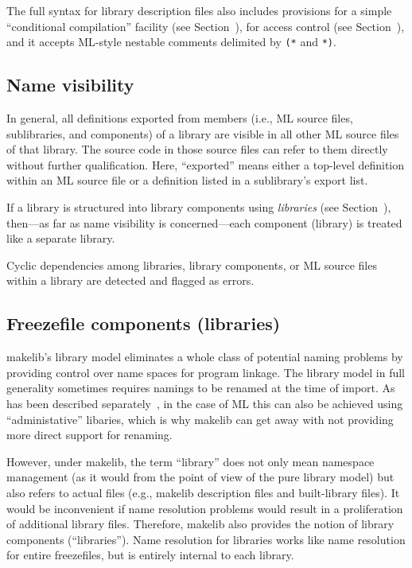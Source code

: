 The full syntax for library description files also includes provisions
for a simple ``conditional compilation'' facility (see
Section~), for access control (see
Section~), and it accepts ML-style nestable comments
delimited by \verb|(*| and \verb|*)|.

\subsection{Name visibility}

In general, all definitions exported from members (i.e., ML source
files, sublibraries, and components) of a library are visible in all
other ML source files of that library.  The source code in those
source files can refer to them directly without further qualification.
Here, ``exported'' means either a top-level definition within an ML
source file or a definition listed in a sublibrary's export list.

If a library is structured into library components using {\em libraries}
(see Section~), then---as far as name visibility is
concerned---each component (library) is treated like a separate library.

Cyclic dependencies among libraries, library components, or ML source
files within a library are detected and flagged as errors.

\subsection{Freezefile components (libraries)}
\label{sec:libraries}

makelib's library model eliminates a whole class of potential naming problems
by providing control over name spaces for program linkage.  The library
model in full generality sometimes requires namings to be renamed at
the time of import. As has been described
separately~\cite{blume:appel:cm99}, in the case of ML this can also be
achieved using ``administative'' libaries, which is why makelib can get
away with not providing more direct support for renaming.

However, under makelib, the term ``library'' does not only mean namespace
management (as it would from the point of view of the pure library
model) but also refers to actual files (e.g., makelib
description files and built-library files).  It would be inconvenient
if name resolution problems would result in a proliferation of
additional library files.  Therefore, makelib also provides the notion of
library components (``libraries'').  Name resolution for libraries works
like name resolution for entire freezefiles, but is entirely
internal to each library.

